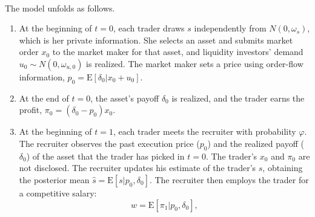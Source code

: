 \paragraph{}
The model unfolds as follows. \vspace*{-0.2cm}
	\begin{enumerate}
		\item At the beginning of $t=0$, each trader draws $s$ independently from $N(0,\omega_{s})$, which is her private information. She selects an asset and submits market order $x_{0}$ to the market maker for that asset, and liquidity investors' demand $u_{0}\sim N(0,\omega_{u,0})$ is realized. The market maker sets a price using order-flow information, $p_{0}=\mathrm{E}\left[\delta_{0}|x_{0}+u_{0}\right]$.
		\item At the end of $t=0$, the asset's payoff $\delta_{0}$ is realized, and the trader earns the profit, $\pi_{0}=(\delta_{0}-p_{0})x_{0}$.
		\item At the beginning of $t=1$, each trader meets the recruiter with probability $\varphi$. The recruiter observes the past execution price ($p_{0}$) and the realized payoff ($\delta_{0}$) of the asset that the trader has picked in $t=0$. The trader's $x_{0}$ and $\pi_{0}$ are not disclosed. %
  The recruiter updates his estimate of the trader's $s$, obtaining the posterior mean $\hat{s}=\mathrm{E}\left[s|p_{0},\delta_{0}\right]$. The recruiter then employs the trader for a competitive salary:
			\begin{equation}
				w=\mathrm{E}[\pi_{1}|p_{0},\delta_{0}],
			\end{equation}

\end{enumerate}
